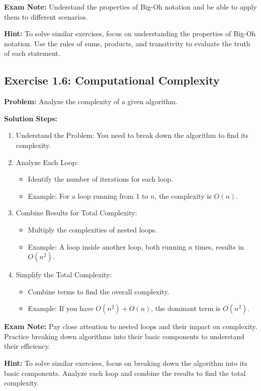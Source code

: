 \textbf{Exam Note:} Understand the properties of Big-Oh notation and be able to apply them to different scenarios.

\textbf{Hint:} To solve similar exercises, focus on understanding the properties of Big-Oh notation. Use the rules of sums, products, and transitivity to evaluate the truth of each statement.

\subsection{Exercise 1.6: Computational Complexity}
\textbf{Problem:} Analyze the complexity of a given algorithm.

\vspace{0.5em}
\textbf{Solution Steps:}
\begin{enumerate}[leftmargin=*,noitemsep]
    \item Understand the Problem: You need to break down the algorithm to find its complexity.
    \item Analyze Each Loop:
    \begin{itemize}
        \item Identify the number of iterations for each loop.
        \item Example: For a loop running from 1 to $n$, the complexity is $O(n)$.
    \end{itemize}
    \item Combine Results for Total Complexity:
    \begin{itemize}
        \item Multiply the complexities of nested loops.
        \item Example: A loop inside another loop, both running $n$ times, results in $O(n^2)$.
    \end{itemize}
    \item Simplify the Total Complexity:
    \begin{itemize}
        \item Combine terms to find the overall complexity.
        \item Example: If you have $O(n^2) + O(n)$, the dominant term is $O(n^2)$.
    \end{itemize}
\end{enumerate}

\textbf{Exam Note:} Pay close attention to nested loops and their impact on complexity. Practice breaking down algorithms into their basic components to understand their efficiency.

\textbf{Hint:} To solve similar exercises, focus on breaking down the algorithm into its basic components. Analyze each loop and combine the results to find the total complexity.


